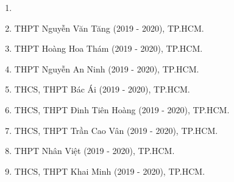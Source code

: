 \begin{enumerate}[label=\bfseries  \arabic*.]
	\item 
	\item THPT Nguyễn Văn Tăng (2019 - 2020), TP.HCM.
	\item THPT Hoàng Hoa Thám (2019 - 2020), TP.HCM.
	\item THPT Nguyễn An Ninh (2019 - 2020), TP.HCM.
	\item THCS, THPT Bác Ái (2019 - 2020), TP.HCM.
	\item THCS, THPT Đinh Tiên Hoàng (2019 - 2020), TP.HCM.
	\item THCS, THPT Trần Cao Vân (2019 - 2020), TP.HCM.
	\item THPT Nhân Việt (2019 - 2020), TP.HCM.
	\item THCS, THPT Khai Minh (2019 - 2020), TP.HCM.
	
\end{enumerate}